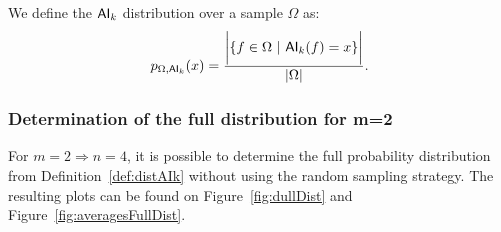 \documentclass[11pt]{llncs}
\begin{document}
\begin{definition}
    We define the $\mathsf{AI}_{k}$ distribution over a sample $\Omega$ as:
    \begin{align*}
        p_{\Omega,\mathsf{AI}_{k} }(x) =  \frac{\bigg|\{f\in \Omega\ | \  \mathsf{AI}_{k}(f) = x\}\bigg|}{|\Omega|}.
    \end{align*}
\end{definition}


\subsubsection{Determination of the full distribution for \texorpdfstring{m=2}{m=2}}
For $m=2 \Rightarrow n = 4$, it is possible to determine the full probability distribution from Definition~\ref{def:distAIk} without using the random sampling strategy. 
The resulting plots can be found on Figure~\ref{fig:dullDist} and Figure~\ref{fig:averagesFullDist}. 
\end{document}
